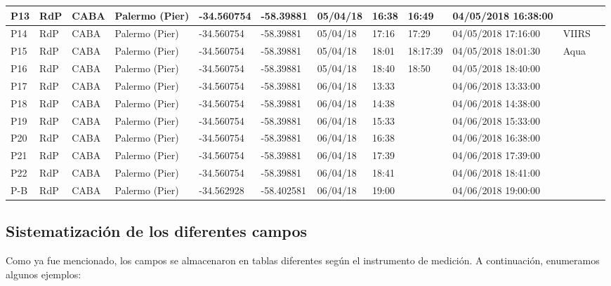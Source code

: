 \begin{table}
\begin{adjustbox}{angle=90}
\begin{tabularx}{1.4\textwidth}{|l|l|l|X|X|X|X|X|X|X|X|X|}
        P13 & RdP & CABA & Palermo (Pier) & -34.560754 & -58.39881 & 05/04/18 & 16:38 & 16:49 & 04/05/2018 16:38:00 &  \\ \hline
        P14 & RdP & CABA & Palermo (Pier) & -34.560754 & -58.39881 & 05/04/18 & 17:16 & 17:29 & 04/05/2018 17:16:00 & VIIRS \\ \hline
        P15 & RdP & CABA & Palermo (Pier) & -34.560754 & -58.39881 & 05/04/18 & 18:01 & 18:17:39 & 04/05/2018 18:01:30 & Aqua \\ \hline
        P16 & RdP & CABA & Palermo (Pier) & -34.560754 & -58.39881 & 05/04/18 & 18:40 & 18:50 & 04/05/2018 18:40:00 &  \\ \hline
        P17 & RdP & CABA & Palermo (Pier) & -34.560754 & -58.39881 & 06/04/18 & 13:33 &  & 04/06/2018 13:33:00 &  \\ \hline
        P18 & RdP & CABA & Palermo (Pier) & -34.560754 & -58.39881 & 06/04/18 & 14:38 &  & 04/06/2018 14:38:00 &  \\ \hline
        P19 & RdP & CABA & Palermo (Pier) & -34.560754 & -58.39881 & 06/04/18 & 15:33 &  & 04/06/2018 15:33:00 &  \\ \hline
        P20 & RdP & CABA & Palermo (Pier) & -34.560754 & -58.39881 & 06/04/18 & 16:38 &  & 04/06/2018 16:38:00 &  \\ \hline
        P21 & RdP & CABA & Palermo (Pier) & -34.560754 & -58.39881 & 06/04/18 & 17:39 &  & 04/06/2018 17:39:00 &  \\ \hline
        P22 & RdP & CABA & Palermo (Pier) & -34.560754 & -58.39881 & 06/04/18 & 18:41 &  & 04/06/2018 18:41:00 &  \\ \hline
        P-B & RdP & CABA & Palermo (Pier) & -34.562928 & -58.402581 & 06/04/18 & 19:00 &  & 04/06/2018 19:00:00 &  \\ \hline
        \end{tabularx}
        \end{adjustbox}
        \label{dat:tab:metadata}
        \end{table}

    \subsection{Sistematización de los diferentes campos}
    \label{dat:s:campos}

        Como ya fue mencionado, los campos se almacenaron en tablas diferentes según el instrumento de medición. A continuación, enumeramos algunos ejemplos:

